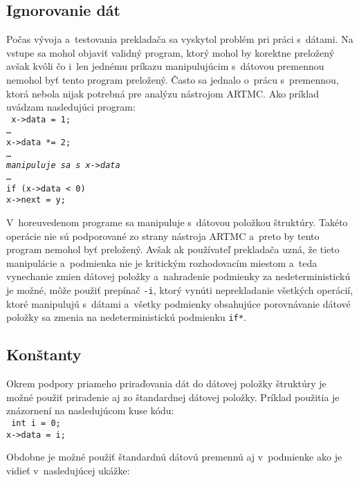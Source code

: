 \subsection{Ignorovanie dát}
Počas vývoja a~testovania prekladača sa vyskytol problém pri práci s~dátami. Na vstupe sa mohol objaviť validný program, ktorý mohol by korektne preložený avšak kvôli čo i~len jednému príkazu manipulujúcim s~dátovou premennou nemohol byť tento program preložený. Často sa jednalo o~prácu s~premennou, ktorá nebola nijak potrebná pre analýzu nástrojom ARTMC. Ako príklad uvádzam nasledujúci program:\\

\noindent
\texttt{
\tab x->data = 1;\\
\tab \dots\\
\tab x->data *= 2;\\
\tab \dots \\
\tab \textit{ manipuluje sa s~x->data }\\
\tab \dots\\
\tab if (x->data < 0)\\
\tab \tab x->next = y;\\
}

V~horeuvedenom programe sa manipuluje s~dátovou položkou štruktúry. Takéto operácie nie sú podporované zo strany nástroja ARTMC a~preto by tento program nemohol byť preložený. Avšak ak používateľ prekladača uzná, že tieto manipulácie a~podmienka nie je kritickým rozhodovacím miestom a~teda vynechanie zmien dátovej položky a~nahradenie podmienky za nedeterministickú je možné, môže použiť prepínač \texttt{-i}, ktorý vynúti neprekladanie všetkých operácií, ktoré manipulujú s~dátami a~všetky podmienky obsahujúce porovnávanie dátové položky sa zmenia na nedeterministickú podmienku \texttt{if*}.

\subsection{Konštanty}
Okrem podpory priameho priraďovania dát do dátovej položky štruktúry je možné použiť priradenie aj zo štandardnej dátovej položky. Príklad použitia je znázornení na nasledujúcom kuse kódu:\\

\noindent
\texttt{
\tab int i~= 0;\\
\tab x->data = i;\\
}

Obdobne je možné použiť štandardnú dátovú premennú aj v~podmienke ako je vidieť v~nasledujúcej ukážke:\\

